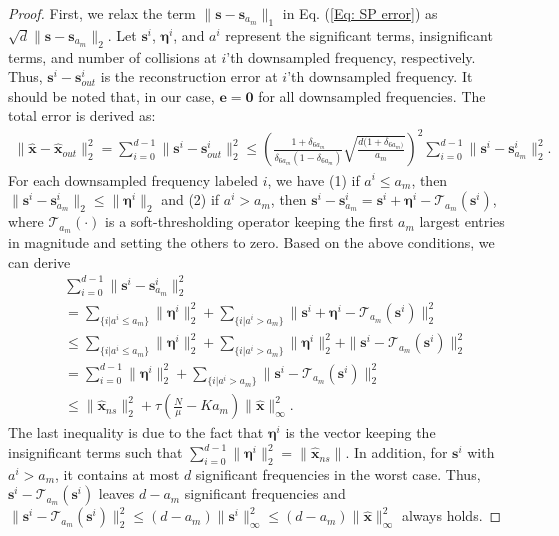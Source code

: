 \documentclass[journal,onecolumn,11pt]{IEEEtran}
\begin{document}
\begin{proof}
First, we relax the term $\| \bm{s} - \bm{s}_{a_{m}} \|_1$ in Eq. (\ref{Eq: SP error}) as $\sqrt{d}\| \bm{s} - \bm{s}_{a_{m}} \|_2$.
Let  $\bm{s}^{i}$, $\bm{\eta}^{i}$, and $a^{i}$ represent the significant terms, insignificant terms, and number of collisions at $i$'th downsampled frequency, respectively.
Thus, $\bm{s}^{i}- \bm{s}^{i}_{out}$ is the reconstruction error at $i$'th downsampled frequency.
It should be noted that, in our case, $\bm{e}=\bm{0}$
for all downsampled frequencies.
The total error is derived as:
\begin{equation}
\begin{aligned}
\| \bm{\hat{x}} - \bm{\hat{x}}_{out} \|_2^{2}  = \sum_{i=0}^{d-1} \|  \bm{s}^{i}- \bm{s}^{i}_{out}  \|_2^2 \leq  \left(  \frac{1 + \delta_{6a_{m}}}{\delta_{6a_{m}} (1 - \delta_{6a_{m}})}\sqrt{\frac{d(1+\delta_{6a_{m})}}{a_{m}}} \right)^{2}  \sum_{i=0}^{d-1} \|  \bm{s}^{i}- \bm{s}^{i}_{a_{m}}  \|_2^2.
\end{aligned}
\label{eq:derivation of sFFT error}
\end{equation}
For each downsampled frequency labeled $i$, we have (1)  if $a^{i} \leq a_{m}$, then $\| \bm{s}^{i} - \bm{s}_{a_{m}}^{i} \|_2 \leq \| \bm{\eta}^{i} \|_2$ and
(2) if $a^{i} > a_{m}$, then $\bm{s}^{i} - \bm{s}_{a_{m}}^{i} = \bm{s}^{i}+\bm{\eta}^{i}-\mathcal{T}_{a_{m}}(\bm{s}^{i})$,
where $\mathcal{T}_{a_{m}}(\cdot)$ is a soft-thresholding operator keeping the first $a_{m}$ largest entries in magnitude and setting the others to zero.
Based on the above conditions, we can derive
\begin{equation}
\begin{aligned}
  &\sum_{i=0}^{d-1} \|  \bm{s}^{i}- \bm{s}^{i}_{a_{m}}  \|_2^2\\
    &= \sum_{ \{i | a^{i} \leq a_m\} } \| \bm{\eta}^{i} \|_{2}^{2}+   \sum_{ \{i | a^{i} > a_m\} }  \| \bm{s}^{i}+\bm{\eta}^{i}-\mathcal{T}_{a_{m}}(\bm{s}^{i}) \|_{2}^{2} \\
   &\leq \sum_{ \{i | a^{i} \leq a_m\} } \| \bm{\eta}^{i} \|_{2}^{2} + \sum_{ \{i | a^{i} > a_m\} } \| \bm{\eta}^{i} \|_{2}^{2} + \| \bm{s}^{i}-\mathcal{T}_{a_{m}}(\bm{s}^{i}) \|_{2}^{2}\\
   &= \sum_{i=0}^{d-1} \| \bm{\eta}^{i} \|_{2}^{2} +  \sum_{ \{i | a^{i} > a_m\} } \| \bm{s}^{i}-\mathcal{T}_{a_{m}}(\bm{s}^{i}) \|_{2}^{2} \\
   &\leq \| \bm{\hat{x}}_{ns} \|_{2}^{2} + \tau(\frac{N}{\mu}-Ka_{m})\| \bm{\hat{x}} \|_{\infty}^{2}.
\end{aligned}
\label{Eq: Derive the error based on am}
\end{equation}
The last inequality is due to the fact that $\bm{\eta}^{i}$ is the vector keeping the insignificant terms such that $ \sum_{i=0}^{d-1} \|  \bm{\eta}^{i} \|_2^2 = \| \bm{\hat{x}}_{ns}\|$.
In addition, for $\bm{s}^{i}$ with $a^{i} > a_m$, it contains at most $d$ significant frequencies in the worst case.
Thus, $\bm{s}^{i}-\mathcal{T}_{a_{m}}(\bm{s}^{i})$ leaves $d-a_{m}$ significant frequencies and
$\| \bm{s}^{i}-\mathcal{T}_{a_{m}}(\bm{s}^{i}) \|_2^2 \leq  (d-a_{m})\| \bm{s}^{i} \|_{\infty}^2 \leq (d-a_{m})\| \bm{\hat{x}} \|_{\infty}^2 $ always holds.


\end{proof}
\end{document}

